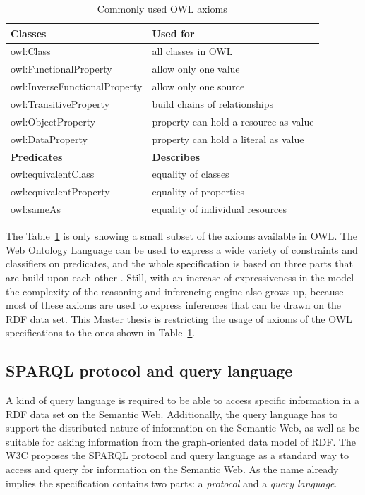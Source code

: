 \begin{table}[H]
\centering
\begin{tabular}{p{5cm}p{7cm}}
\hline
\textbf{Classes} & \textbf{Used for} \\
\hline
owl:Class & all classes in \gls{OWL}  \\
\hline
owl:FunctionalProperty & allow only one value \\
\hline
owl:InverseFunctionalProperty & allow only one source \\
\hline
owl:TransitiveProperty & build chains of relationships \\
\hline
owl:ObjectProperty & property can hold a resource as value \\
\hline
owl:DataProperty & property can hold a literal as value \\
\hline
\textbf{Predicates} & \textbf{Describes} \\
\hline
owl:equivalentClass &	equality of classes \\
\hline
owl:equivalentProperty & equality of properties \\
\hline
owl:sameAs & equality of individual resources \\
\hline
\end{tabular}
\caption[Commonly used \gls{OWL} axioms]{Commonly used \gls{OWL} axioms \citep[pg. 153-185]{allemang2011semantic}}
\label{tab:w3c_vocab_owl}
\end{table}

The Table~\ref{tab:w3c_vocab_owl} is only showing a small subset of the axioms available in \gls{OWL}. The Web Ontology Language can be used to express a wide variety of constraints and classifiers on predicates, and the whole specification is based on three parts that are build upon each other \citep{owlspec}. Still, with an increase of expressiveness in the model the complexity of the reasoning and inferencing engine also grows up, because most of these axioms are used to express inferences that can be drawn on the \gls{RDF} data set. This Master thesis is restricting the usage of axioms of the \gls{OWL} specifications to the ones shown in Table~\ref{tab:w3c_vocab_owl}.


\subsection{\gls{SPARQL} protocol and query language}
\label{sec:semantic_querylang}

A kind of query language is required to be able to access specific information in a \gls{RDF} data set on the Semantic Web. Additionally, the query language has to support the distributed nature of information on the Semantic Web, as well as be suitable for asking information from the graph-oriented data model of \gls{RDF}. The \gls{W3C} proposes the \gls{SPARQL} protocol and query language as a standard way to access and query for information on the Semantic Web. As the name already implies the specification contains two parts: a \emph{protocol} and a \emph{query language}. \\

